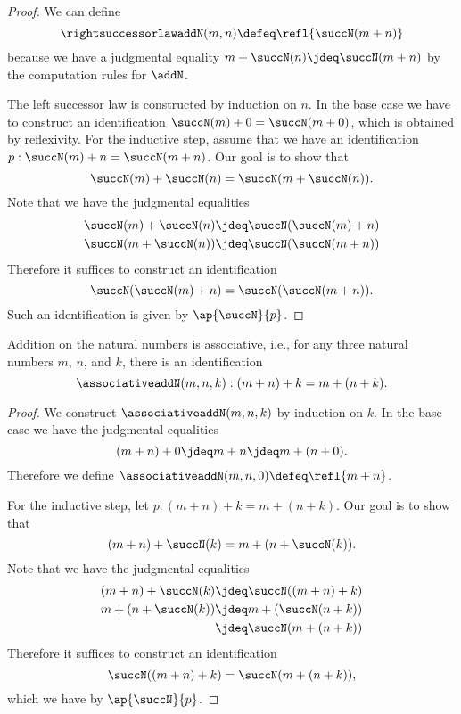 \begin{proof}
  We can define
  \begin{equation*}
    \rightsuccessorlawaddN(m,n)\defeq\refl{\succN(m+n)}
  \end{equation*}
  because we have a judgmental equality $m+\succN(n)\jdeq\succN(m+n)$ by the computation rules for $\addN$.

  The left successor law is constructed by induction on $n$. In the base case we have to construct an identification $\succN(m)+0=\succN(m+0)$, which is obtained by reflexivity. For the inductive step, assume that we have an identification $p:\succN(m)+n=\succN(m+n)$. Our goal is to show that
  \begin{equation*}
    \succN(m)+\succN(n)=\succN(m+\succN(n)). 
  \end{equation*}
  Note that we have the judgmental equalities
  \begin{align*}
    \succN(m)+\succN(n) & \jdeq\succN(\succN(m)+n) \\
    \succN(m+\succN(n)) & \jdeq\succN(\succN(m+n))
  \end{align*}
  Therefore it suffices to construct an identification
  \begin{equation*}
    \succN(\succN(m)+n)=\succN(\succN(m+n)).
  \end{equation*}
  Such an identification is given by $\ap{\succN}{p}$.
\end{proof}

\begin{prp}
  Addition on the natural numbers is associative, i.e., for any three natural numbers $m$, $n$, and $k$, there is an identification
  \begin{equation*}
    \associativeaddN(m,n,k):(m+n)+k=m+(n+k).
  \end{equation*}
\end{prp}

\begin{proof}
  We construct $\associativeaddN(m,n,k)$ by induction on $k$. In the base case we have the judgmental equalities
  \begin{equation*}
    (m+n)+0\jdeq m+n\jdeq m+(n+0).
  \end{equation*}
  Therefore we define $\associativeaddN(m,n,0)\defeq\refl{m+n}$.

  For the inductive step, let $p:(m+n)+k=m+(n+k)$. Our goal is to show that
  \begin{equation*}
    (m+n)+\succN(k)=m+(n+\succN(k)).
  \end{equation*}
  Note that we have the judgmental equalities
  \begin{align*}
    (m+n)+\succN(k) & \jdeq \succN((m+n)+k) \\
    m+(n+\succN(k)) & \jdeq m+(\succN(n+k)) \\
                    & \jdeq \succN(m+(n+k))
  \end{align*}
  Therefore it suffices to construct an identification
  \begin{equation*}
    \succN((m+n)+k)=\succN(m+(n+k)),
  \end{equation*}
  which we have by $\ap{\succN}{p}$.
\end{proof}

